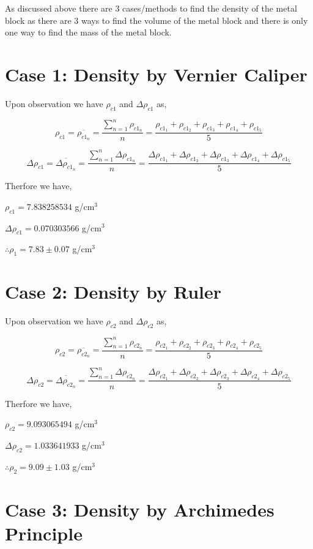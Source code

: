 
{As discussed above there are 3 cases/methods to find the density of the metal block as there are 3 ways to find the volume of the metal block and there is only one way to find the mass of the metal block.}

\section{{Case 1: Density by Vernier Caliper}}

{Upon observation we have $\rho_{c1}$ and $\Delta \rho_{c1}$ as,}

	$$\rho_{c1} = \overline{\rho_{c1_n}} = \frac{\sum_{n=1}^{n}\rho_{c1_n}}{n} = \frac{\rho_{c1_1} + \rho_{c1_2} + \rho_{c1_3} + \rho_{c1_4} + \rho_{c1_5}}{5}$$

	$$\Delta \rho_{c1} = \overline{\Delta \rho_{c1_n}} = \frac{\sum_{n=1}^{n}\Delta \rho_{c1_n}}{n} = \frac{\Delta \rho_{c1_1} + \Delta \rho_{c1_2} + \Delta \rho_{c1_3} + \Delta \rho_{c1_4} + \Delta \rho_{c1_5}}{5}$$

{Therfore we have,}

{$\rho_{c1} = 7.838258534$ g/cm$^3$}

{$\Delta \rho_{c1} = 0.070303566$ g/cm$^3$}

{$\therefore \rho_{1} = 7.83 \pm 0.07$ g/cm$^3$}

\section{{Case 2: Density by Ruler}}

{Upon observation we have $\rho_{c2}$ and $\Delta \rho_{c2}$ as,}

	$$\rho_{c2} = \overline{\rho_{c2_n}} = \frac{\sum_{n=1}^{n}\rho_{c2_n}}{n} = \frac{\rho_{c2_1} + \rho_{c2_2} + \rho_{c2_3} + \rho_{c2_4} + \rho_{c2_5}}{5}$$

	$$\Delta \rho_{c2} = \overline{\Delta \rho_{c2_n}} = \frac{\sum_{n=1}^{n}\Delta \rho_{c2_n}}{n} = \frac{\Delta \rho_{c2_1} + \Delta \rho_{c2_2} + \Delta \rho_{c2_3} + \Delta \rho_{c2_4} + \Delta \rho_{c2_5}}{5}$$

{Therfore we have,}

{$\rho_{c2} = 9.093065494$ g/cm$^3$}

{$\Delta \rho_{c2} = 1.033641933$ g/cm$^3$}

{$\therefore \rho_{2} = 9.09 \pm 1.03$ g/cm$^3$}

\section{{Case 3: Density by Archimedes Principle}}

